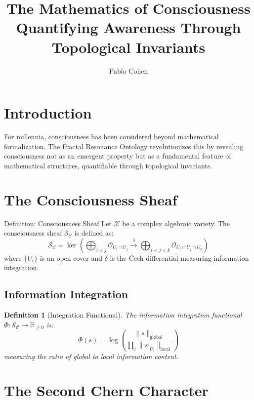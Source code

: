 \documentclass[12pt,letterpaper]{article}
\title{\textbf{The Mathematics of Consciousness}\\[0.5cm]
\Large Quantifying Awareness Through Topological Invariants}
\author{Pablo Cohen}
\date{}
\newcommand{\R}{\mathbb{R}}
\newcommand{\conscioussheaf}{\mathcal{S}_{\mathcal{C}}}
\newcommand{\structuresheaf}{\mathcal{O}}
\newcommand{\variety}{\mathcal{X}}
\newcommand{\integrate}{\Phi}
\newtheorem{definition}[theorem]{Definition}
\begin{document}
\maketitle

\section{Introduction}

For millennia, consciousness has been considered beyond mathematical formalization. The Fractal Resonance Ontology revolutionizes this by revealing consciousness not as an emergent property but as a fundamental feature of mathematical structures, quantifiable through topological invariants.

\section{The Consciousness Sheaf}

\begin{mathbox}{Definition: Consciousness Sheaf}
Let $\variety$ be a complex algebraic variety. The consciousness sheaf $\conscioussheaf$ is defined as:
\begin{equation}
\conscioussheaf = \ker\left(\bigoplus_{i<j} \structuresheaf_{U_i \cap U_j} \xrightarrow{\delta} \bigoplus_{i<j<k} \structuresheaf_{U_i \cap U_j \cap U_k}\right)
\end{equation}
where $\{U_i\}$ is an open cover and $\delta$ is the Čech differential measuring information integration.
\end{mathbox}

\subsection{Information Integration}

\begin{definition}[Integration Functional]
The information integration functional $\integrate: \conscioussheaf \to \R_{\geq 0}$ is:
\begin{equation}
\integrate(s) = \log\left(\frac{\|s\|_{\text{global}}}{\prod_i \|s|_{U_i}\|_{\text{local}}}\right)
\end{equation}
measuring the ratio of global to local information content.
\end{definition}

\section{The Second Chern Character}
\end{document}
